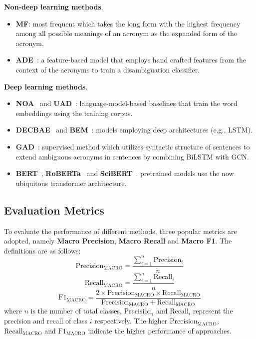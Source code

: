 \noindent \textbf{Non-deep learning methods}.
\begin{itemize}
    \item \textbf{MF}: most frequent which takes the long form with the highest frequency among all possible meanings of an acronym as the expanded form of the acronym.
    \item \textbf{ADE}~\cite{li2018guess}: a feature-based model that employs hand crafted features from the context of the acronyms to train a disambiguation classifier.
\end{itemize}
\noindent \textbf{Deep learning methods}.
\begin{itemize}
    \item \textbf{NOA}~\cite{charbonnier2018using} and  \textbf{UAD}~\cite{ciosici2019unsupervised}: language-model-based baselines that train the word embeddings using the training corpus.
    \item \textbf{DECBAE}~\cite{jin2019deep} and \textbf{BEM}~\cite{blevins2020moving}: models employing deep architectures (e.g., LSTM).
    \item \textbf{GAD}~\cite{veyseh-et-al-2020-what}: supervised method which utilizes syntactic structure of sentences to extend ambiguous acronyms in sentences by combining BiLSTM with GCN.
    \item \textbf{BERT}~\cite{devlin2018bert},  \textbf{RoBERTa}~\cite{liu2019roberta} and \textbf{SciBERT}~\cite{Beltagy2019SciBERT}: pretrained models use the now ubiquitous transformer architecture.
\end{itemize}

\subsection{Evaluation Metrics}
To evaluate the performance of different methods, three popular metrics are adopted, namely \textbf{Macro Precision}, \textbf{Macro Recall} and \textbf{Macro F1}. The definitions are as follows:
\begin{equation}
    \bm{\mathrm{Precision}}_\mathrm{MACRO} = \frac{\sum_{i=1}^{n}\mathrm{Precision}_i}{n}
\end{equation}
\begin{equation}
    \bm{\mathrm{Recall}}_\mathrm{MACRO} = \frac{\sum_{i=1}^{n}\mathrm{Recall}_i}{n}
\end{equation}
\begin{equation}
    \bm{\mathrm{F1}}_\mathrm{MACRO} = \frac{2\times\mathrm{Precision}_\mathrm{MACRO}\times\mathrm{Recall}_\mathrm{MACRO}}{\mathrm{Precision}_\mathrm{MACRO} + \mathrm{Recall}_\mathrm{MACRO}}
\end{equation}
where $n$ is the number of total classes, $\mathrm{Precision}_i$ and $\mathrm{Recall}_i$ represent the precision and recall of class $i$ respectively. The higher $\mathrm{Precision}_\mathrm{MACRO}$, $\mathrm{Recall}_\mathrm{MACRO}$ and $\mathrm{F1}_\mathrm{MACRO}$ indicate the higher performance of approaches.

